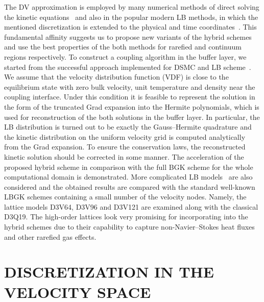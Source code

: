 \documentclass{aip-cp}
\begin{document}
The DV approximation is employed by many numerical methods of direct solving the kinetic equations~\cite{Cercignani2000}
and also in the popular modern LB methods, in which the mentioned discretization is extended to the physical and
time coordinates~\cite{Succi2018}. This fundamental affinity suggests us to propose new variants of the hybrid schemes
and use the best properties of the both methods for rarefied and continuum regions respectively.
To construct a coupling algorithm in the buffer layer,
we started from the successful approach implemented for DSMC and LB scheme~\cite{Staso2016long}.
We assume that the velocity distribution function (VDF) is close to the equilibrium state with zero
bulk velocity, unit temperature and density near the coupling interface.
Under this condition it is feasible to represent the solution in the form of the truncated Grad expansion into the Hermite polynomials,
which is used for reconstruction of the both solutions in the buffer layer.
In particular, the LB distribution is turned out to be exactly the Gauss--Hermite quadrature
and the kinetic distribution on the uniform velocity grid is computed analytically from the Grad expansion.
To ensure the conservation laws, the reconstructed kinetic solution should be corrected in some manner.
The acceleration of the proposed hybrid scheme in comparison with the full BGK scheme for the whole computational domain is demonstrated.
More complicated LB models~\cite{Feuchter2016} are also considered
and the obtained results are compared with the standard well-known LBGK schemes containing a small number of the velocity nodes.
Namely, the lattice models D3V64, D3V96 and D3V121 are examined along with the classical D3Q19.
The high-order lattices look very promising for incorporating into the hybrid schemes due
to their capability to capture non-Navier--Stokes heat fluxes and other rarefied gas effects.

\section{DISCRETIZATION IN THE VELOCITY SPACE}\label{sec:discretization}
\end{document}
